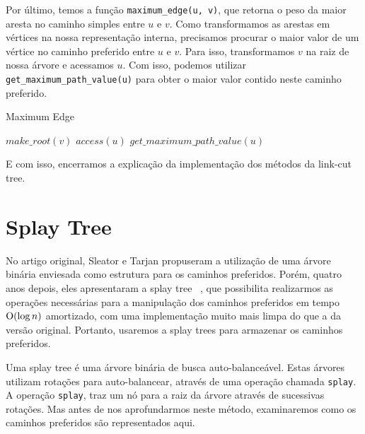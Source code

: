Por último, temos a função \texttt{maximum\_edge(u, v)}, que retorna o peso da maior aresta no caminho simples entre $u$ e $v$. Como transformamos as arestas em vértices na nossa representação interna, precisamos procurar o maior valor de um vértice no caminho preferido entre $u$ e $v$. Para isso, transformamos $v$ na raiz de nossa árvore e acessamos $u$. Com isso, podemos utilizar \texttt{get\_maximum\_path\_value(u)} para obter o maior valor contido neste caminho preferido.

\begin{algorithm}[h!]
    \caption{Maximum Edge}\label{lct:max-edge}
    \begin{algorithmic}
        \State $make\_root(v)$
        \State $access(u)$
        \State \Return $get\_maximum\_path\_value(u)$
        \EndFunction
    \end{algorithmic}
\end{algorithm}

E com isso, encerramos a explicação da implementação dos métodos da link-cut tree.

\section{Splay Tree}
\label{sec:lct-splay-trees}

No artigo original, Sleator e Tarjan propuseram a utilização de uma árvore binária enviesada como estrutura para os caminhos preferidos. Porém, quatro anos depois, eles apresentaram a splay tree ~\citep{10.1145/3828.3835}, que possibilita realizarmos as operações necessárias para a manipulação dos caminhos preferidos em tempo $\mathrm{O}(\log n)$ amortizado, com uma implementação muito mais limpa do que a da versão original. Portanto, usaremos a splay trees para armazenar os caminhos preferidos.

Uma splay tree é uma árvore binária de busca auto-balanceável. Estas árvores utilizam rotações para auto-balancear, através de uma operação chamada \texttt{splay}. A operação \texttt{splay}, traz um nó para a raiz da árvore através de sucessivas rotações. Mas antes de nos aprofundarmos neste método, examinaremos como os caminhos preferidos são representados aqui.

